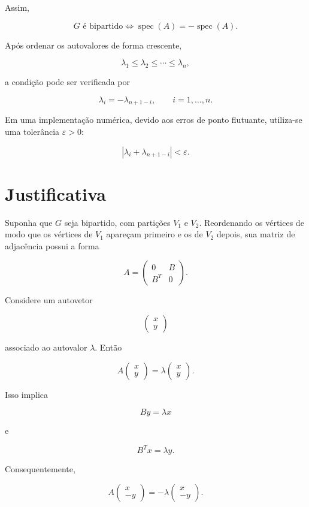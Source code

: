 \documentclass[12pt,a4paper]{article}
\begin{document}
Assim,

$$
G\text{ é bipartido}
\iff
\operatorname{spec}(A)
=
-\operatorname{spec}(A).
$$

Após ordenar os autovalores de forma crescente,

$$
\lambda_1\leq\lambda_2\leq\cdots\leq\lambda_n,
$$

a condição pode ser verificada por

$$
\lambda_i=-\lambda_{n+1-i},
\qquad
i=1,\ldots,n.
$$

Em uma implementação numérica, devido aos erros de ponto flutuante,
utiliza-se uma tolerância $\varepsilon>0$:

$$
\left|\lambda_i+\lambda_{n+1-i}\right|<\varepsilon.
$$

\section{Justificativa}

Suponha que $G$ seja bipartido, com partições $V_1$ e $V_2$.
Reordenando os vértices de modo que os vértices de $V_1$ apareçam
primeiro e os de $V_2$ depois, sua matriz de adjacência possui a forma

$$
A=
\begin{pmatrix}
0 & B\\
B^T & 0
\end{pmatrix}.
$$

Considere um autovetor

$$
\begin{pmatrix}
x\\y
\end{pmatrix}
$$

associado ao autovalor $\lambda$. Então

$$
A
\begin{pmatrix}
x\\y
\end{pmatrix}
=
\lambda
\begin{pmatrix}
x\\y
\end{pmatrix}.
$$

Isso implica

$$
By=\lambda x
$$

e

$$
B^Tx=\lambda y.
$$

Consequentemente,

$$
A
\begin{pmatrix}
x\\-y
\end{pmatrix}
=
-\lambda
\begin{pmatrix}
x\\-y
\end{pmatrix}.
$$
\end{document}
